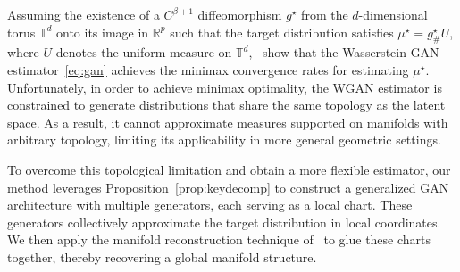 \documentclass[10pt]{article}
\begin{document}
Assuming the existence of a \( C^{\beta+1} \) diffeomorphism \( g^\star \) from the \( d \)-dimensional torus \( \mathbb{T}^d \) onto its image in \( \mathbb{R}^p \) such that the target distribution satisfies \( \mu^\star = g^\star_{\#} U \), where \( U \) denotes the uniform measure on \( \mathbb{T}^d \),~\cite{stephanovitch2023wasserstein} show that the Wasserstein GAN estimator~\eqref{eq:gan} achieves the minimax convergence rates for estimating \( \mu^\star \). Unfortunately, in order to achieve minimax optimality, the WGAN estimator is constrained to generate distributions that share the same topology as the latent space. As a result, it cannot approximate measures supported on manifolds with arbitrary topology, limiting its applicability in more general geometric settings.

To overcome this topological limitation and obtain a more flexible estimator, our method leverages Proposition~\ref{prop:keydecomp} to construct a generalized GAN architecture with multiple generators, each serving as a local chart. These generators collectively approximate the target distribution in local coordinates. We then apply the manifold reconstruction technique of~\cite{fefferman2015reconstruction} to glue these charts together, thereby recovering a global manifold structure.
\end{document}
